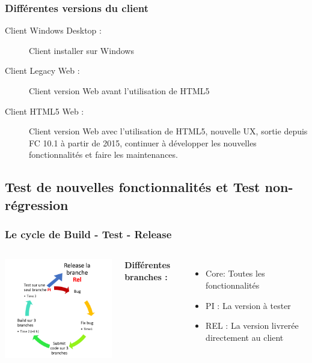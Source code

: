 \documentclass{beamer}
\begin{document}
        \begin{frame}[t]
        \frametitle{Différentes versions du client}
            \begin{description}
                \item [Client Windows Desktop :] Client installer sur Windows
                \item [Client Legacy Web :] Client version Web avant l'utilisation de HTML5
                \item [Client HTML5 Web :] Client version Web avec l'utilisation de HTML5, nouvelle UX, sortie depuis FC 10.1 à partir de 2015, continuer à développer les nouvelles fonctionnalités et faire les maintenances.
            \end{description}
        \end{frame}
        
        \subsection{Test de nouvelles fonctionnalités et Test non-régression}
        \begin{frame}
            \frametitle{Le cycle de Build - Test - Release}
            \begin{columns}
                \centering
                \includegraphics[width=8cm]{cycle_build_release.png}
                
                \textbf{Différentes branches :} 
                \begin{itemize}
                    \item Core: Toutes les fonctionnalités
                    \item PI : La version à tester
                    \item REL : La version livrerée directement au client
                \end{itemize}
            \end{columns}
        \end{frame}
        
\end{document}
